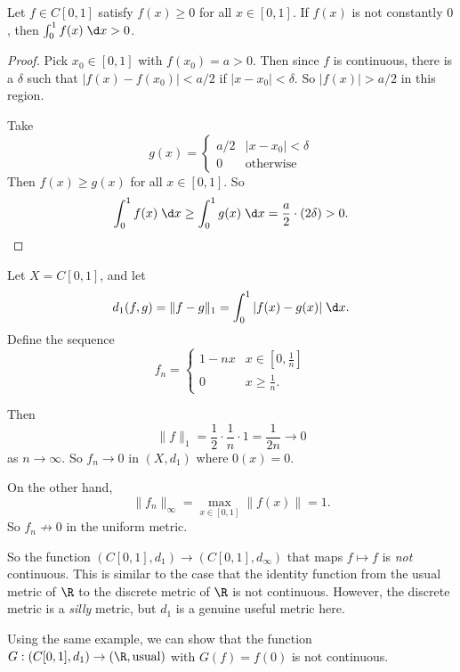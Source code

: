 \documentclass[a4paper]{article}
\begin{document}
\begin{lemma}
  Let $f\in C[0, 1]$ satisfy $f(x) \geq 0$ for all $x\in [0, 1]$. If $f(x)$ is not constantly $0$, then $\int_0^1 f(x)\;\d x > 0$.
\end{lemma}

\begin{proof}
  Pick $x_0 \in [0, 1]$ with $f(x_0) = a > 0$. Then since $f$ is continuous, there is a $\delta$ such that $|f(x) - f(x_0)| < a/2$ if $|x - x_0| < \delta$. So $|f(x)| > a/2$ in this region.

  Take
  \[
    g(x) =
    \begin{cases}
      a/2 & |x - x_0| < \delta\\
      0 & \text{otherwise}
    \end{cases}
  \]
  Then $f(x) \geq g(x)$ for all $x\in [0, 1]$. So
  \[
    \int_0^1 f(x)\;\d x \geq \int_0^1 g(x)\;\d x = \frac{a}{2}\cdot (2\delta) > 0.
  \]
\end{proof}

\begin{eg}
  Let $X = C[0, 1]$, and let
  \[
    d_1(f, g) = \|f - g\|_1 = \int_0^1 |f(x) - g(x)|\;\d x.
  \]
  Define the sequence
  \[
    f_n =
    \begin{cases}
      1 - nx & x \in [0, \frac{1}{n}]\\
      0 & x \geq \frac{1}{n}.
    \end{cases}
  \]
  \begin{center}
  \end{center}
  Then
  \[
    \|f\|_1 = \frac{1}{2}\cdot \frac{1}{n} \cdot 1 = \frac{1}{2n} \to 0
  \]
  as $n \to \infty$. So $f_n \to 0$ in $(X, d_1)$ where $0(x) = 0$.

  On the other hand,
  \[
    \|f_n\|_\infty = \max_{x\in [0, 1]} \|f(x)\| = 1.
  \]
  So $f_n \not\to 0$ in the uniform metric.

  So the function $(C[0, 1], d_1) \to (C[0, 1], d_\infty)$ that maps $f\mapsto f$ is \emph{not} continuous. This is similar to the case that the identity function from the usual metric of $\R$ to the discrete metric of $\R$ is not continuous. However, the discrete metric is a \emph{silly} metric, but $d_1 $ is a genuine useful metric here.

  Using the same example, we can show that the function $G: (C[0, 1], d_1) \to (\R, \text{usual})$ with $G(f) = f(0)$ is not continuous.
\end{eg}
\end{document}
